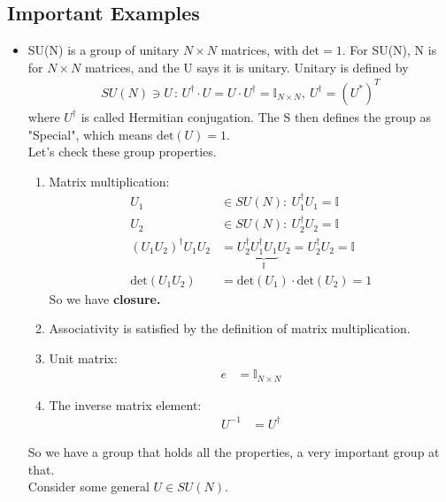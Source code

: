 \documentclass[relqm.tex]{subfiles}
\begin{document}
\subsection{Important Examples}
\begin{itemize}
    \item SU(N) is a group of unitary $N\times N$ matrices, with $\text{det}=1$. For SU(N), N is for $N\times N$ matrices, and the U says it is unitary. 
        Unitary is defined by
        \begin{align}
            SU(N) \ni U\,:\, U^\dagger\cdot U = U\cdot U^\dagger = \mathbb{I}_{N\times N},~ U^\dagger = (U^*)^T
        \end{align}
        where $U^\dagger$ is called Hermitian conjugation. 
        The S then defines the group as "Special", which means $\text{det}(U) = 1$.\\
        Let's check these group properties. 
        \begin{enumerate}
            \item Matrix multiplication:
                \begin{align}
                    U_1 &\in SU(N):~ U_1^\dagger U_1 = \mathbb{I} \\
                    U_2 &\in SU(N):~ U_2^\dagger U_2 = \mathbb{I} \\
                    (U_1U_2)^\dagger U_1U_2 &= U_2^\dagger \underbrace{U^\dagger_1 U_1}_{\mathbb{I}}U_2 = U^\dagger_2 U_2 = \mathbb{I} \\
                    \text{det}(U_1U_2) &= \text{det}(U_1)\cdot\text{det}(U_2) = 1
                \end{align}
                So we have \textbf{closure.}
            \item Associativity is satisfied by the definition of matrix multiplication.
            \item Unit matrix:
                \begin{align}
                    e &= \mathbb{I}_{N\times N} 
                \end{align}
            \item The inverse matrix element:
                \begin{align}
                    U^{-1} &= U^\dagger
                \end{align}
        \end{enumerate}
        So we have a group that holds all the properties, a very important group at that. \\
        Consider some general $U \in SU(N)$. 

\end{itemize}
\end{document}
